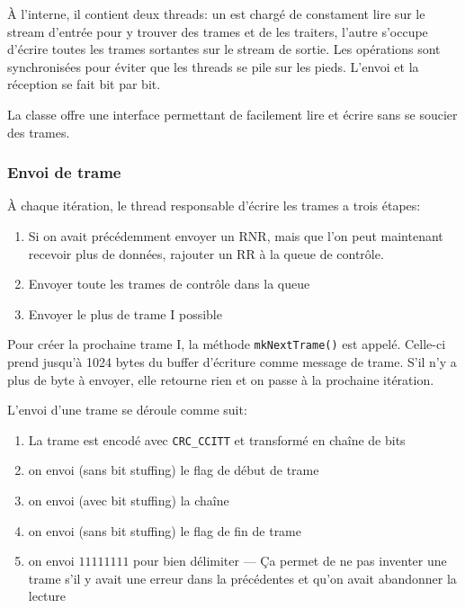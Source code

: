 \documentclass{article}
\begin{document}
    À l'interne, il contient deux threads: un est chargé de constament lire sur le stream d'entrée pour y trouver des trames et de les traiters, l'autre s'occupe d'écrire toutes les trames sortantes sur le stream de sortie. Les opérations sont synchronisées pour éviter que les threads se pile sur les pieds. L'envoi et la réception se fait bit par bit.

    La classe offre une interface permettant de facilement lire et écrire sans se soucier des trames.

    \subsubsection{Envoi de trame}
    À chaque itération, le thread responsable d'écrire les trames a trois étapes:
    \begin{enumerate}
        \item Si on avait précédemment envoyer un RNR, mais que l'on peut maintenant recevoir plus de données, rajouter un RR à la queue de contrôle.
        \item Envoyer toute les trames de contrôle dans la queue
        \item Envoyer le plus de trame I possible
    \end{enumerate}
    Pour créer la prochaine trame I, la méthode \verb#mkNextTrame()# est appelé. Celle-ci prend jusqu'à 1024 bytes du buffer d'écriture comme message de trame. S'il n'y a plus de byte à envoyer, elle retourne rien et on passe à la prochaine itération.

    L'envoi d'une trame se déroule comme suit:
    \begin{enumerate}
        \item La trame est encodé avec \verb#CRC_CCITT# et transformé en chaîne de bits
        \item on envoi (sans bit stuffing) le flag de début de trame
        \item on envoi (avec bit stuffing) la chaîne
        \item on envoi (sans bit stuffing) le flag de fin de trame
        \item on envoi $11111111$ pour bien délimiter --- Ça permet de ne pas inventer une trame s'il y avait une erreur dans la précédentes et qu'on avait abandonner la lecture
    \end{enumerate}
\end{document}
